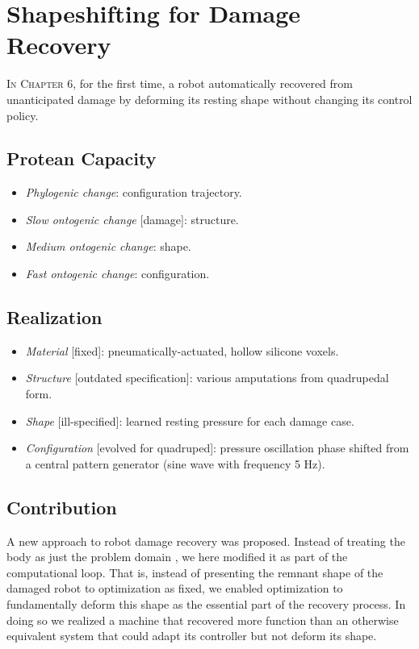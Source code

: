 \section{Shapeshifting for Damage Recovery}


\textsc{In Chapter 6,}
for the first time, a robot automatically recovered from unanticipated damage by deforming its resting shape without changing its control policy.

\subsection{Protean Capacity}

\begin{itemize}
    \item \textit{Phylogenic change}: configuration trajectory.
    \item \textit{Slow ontogenic change} [damage]: structure.
    \item \textit{Medium ontogenic change}: shape.
    \item \textit{Fast ontogenic change}: configuration.
\end{itemize}


\subsection{Realization}

\begin{itemize}
    \item \textit{Material} [fixed]: pneumatically-actuated, hollow silicone voxels.
    \item \textit{Structure} [outdated specification]: various amputations from quadrupedal form.
    \item \textit{Shape} [ill-specified]: learned resting pressure for each damage case.
    \item \textit{Configuration} [evolved for quadruped]: pressure oscillation phase shifted from a central pattern generator (sine wave with frequency 5 Hz).
\end{itemize}



\subsection{Contribution}



A new approach to robot damage recovery was proposed.
Instead of treating the body as just the problem domain \cite{bongard2006resilient,cully2015robots}, we here modified it as part of the computational loop.
That is, 
instead of presenting the remnant shape of the damaged robot to optimization as 
fixed, we enabled optimization to fundamentally deform this shape as the essential part of the recovery process.
In doing so we realized a machine that recovered more function than an otherwise equivalent system that could adapt its controller but not deform its shape.

